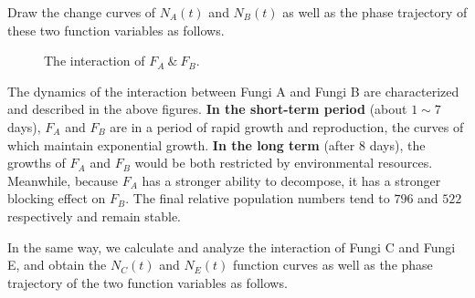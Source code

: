 Draw the change curves of $N_A(t)$ and $N_B(t)$ as well as the phase trajectory of these two function variables as follows.
\par
\begin{figure}[H]
  \centering
  \caption{The interaction of $F_A\ \&\ F_B$.}
\end{figure}
\par
The dynamics of the interaction between Fungi A and Fungi B are characterized and described in the above figures. \textbf{In the short-term period} (about $1\sim 7$ days), $F_A$ and $F_B$ are in a period of rapid growth and reproduction, the curves of which maintain exponential growth. \textbf{In the long term} (after $8$ days), the growths of $F_A$ and $F_B$ would be both restricted by environmental resources. Meanwhile, because $F_A$ has a stronger ability to decompose, it has a stronger blocking effect on $F_B$. The final relative population numbers tend to $796$ and $522$ respectively and remain stable.
\par
In the same way, we calculate and analyze the interaction of Fungi C and Fungi E, and obtain the $N_C(t)$ and $N_E(t)$ function curves as well as the phase trajectory of the two function variables as follows.
\par
